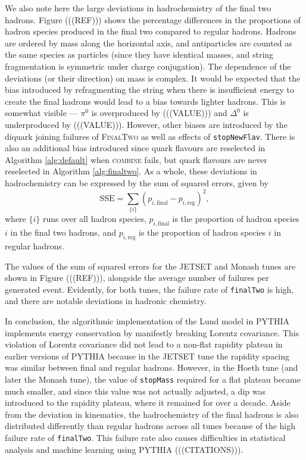 \documentclass[12pt,a4paper]{report}
\begin{document}
We also note here the large deviations in hadrochemistry of the final two hadrons. Figure (((REF))) shows the percentage differences in the proportions of hadron species produced in the final two compared to regular hadrons. Hadrons are ordered by mass along the horizontal axis, and antiparticles are counted as the same species as particles (since they have identical masses, and string fragmentation is symmetric under charge conjugation). The dependence of the deviations (or their direction) on mass is complex. It would be expected that the bias introduced by refragmenting the string when there is insufficient energy to create the final hadrons would lead to a bias towards lighter hadrons. This is somewhat visible --- $\pi^0$ is overproduced by (((VALUE))) and $\Delta^0$ is underproduced by (((VALUE))). However, other biases are introduced by the diquark joining failures of \textsc{FinalTwo} as well as effects of \texttt{stopNewFlav}. There is also an additional bias introduced since quark flavours are reselected in Algorithm \ref{alg:default} when \textsc{combine} fails, but quark flavours are never reselected in Algorithm \ref{alg:finaltwo}. As a whole, these deviations in hadrochemistry can be expressed by the sum of squared errors, given by
\begin{equation}
  \text{SSE} = \sum_{\{i\}} (p_{i,\text{final}} - p_{i,\text{reg}})^2,
\end{equation}
where $\{i\}$ runs over all hadron species, $p_{i,\text{final}}$ is the proportion of hadron species $i$ in the final two hadrons, and $p_{i,\text{reg}}$ is the proportion of hadron species $i$ in regular hadrons.

The values of the sum of squared errors for the JETSET and Monash tunes are shown in Figure (((REF))), alongside the average number of failures per generated event. Evidently, for both tunes, the failure rate of \texttt{finalTwo} is high, and there are notable deviations in hadronic chemistry.

In conclusion, the algorithmic implementation of the Lund model in PYTHIA implements energy conservation by manifestly breaking Lorentz covariance. This violation of Lorentz covariance did not lead to a non-flat rapidity plateau in earlier versions of PYTHIA because in the JETSET tune the rapidity spacing was similar between final and regular hadrons. However, in the Hoeth tune (and later the Monash tune), the value of \texttt{stopMass} required for a flat plateau became much smaller, and since this value was not actually adjusted, a dip was introduced to the rapidity plateau, where it remained for over a decade. Aside from the deviation in kinematics, the hadrochemistry of the final hadrons is also distributed differently than regular hadrons across all tunes because of the high failure rate of \texttt{finalTwo}. This failure rate also causes difficulties in statistical analysis and machine learning using PYTHIA (((CITATIONS))).
\end{document}
